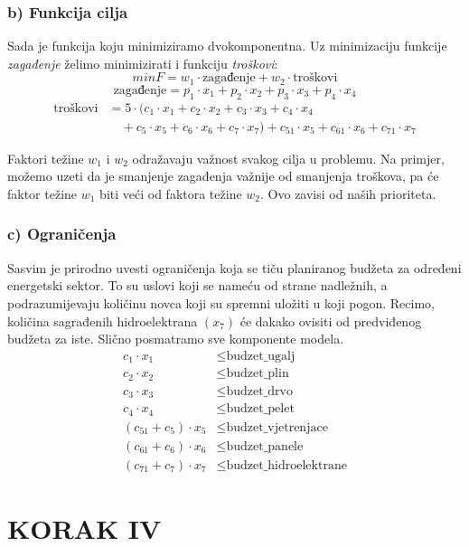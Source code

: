 \documentclass[12pt, a4paper]{paper}
\begin{document}
\subsubsection*{b) Funkcija cilja}

Sada je funkcija koju minimiziramo dvokomponentna. Uz minimizaciju funkcije \textit{zagađenje} želimo minimizirati i funkciju \textit{troškovi}:
\[min F = w_1 \cdot \text{zagađenje} + w_2 \cdot \text{troškovi}\]
\[\text{zagađenje} = p_1 \cdot x_1 + p_2 \cdot x_2 + p_3 \cdot x_3 + p_4 \cdot x_4\]
\[
\begin{split}
    \text{troškovi} & = 5 \cdot (c_1 \cdot x_1 + c_2 \cdot x_2 + c_3 \cdot x_3 + c_4 \cdot x_4 \\
    & \quad + c_5 \cdot x_5 + c_6 \cdot x_6 + c_7 \cdot x_7) + c_{51} \cdot x_5 + c_{61} \cdot x_6 + c_{71} \cdot x_7
\end{split}
\]

Faktori težine $w_1$ i $w_2$ odražavaju važnost svakog cilja u problemu. Na primjer, možemo uzeti da je smanjenje zagađenja važnije od smanjenja troškova, pa će faktor težine $w_1$ biti veći od faktora težine $w_2$. Ovo zavisi od naših prioriteta.

\subsubsection*{c) Ograničenja}

Sasvim je prirodno uvesti ograničenja koja se tiču planiranog budžeta za određeni energetski sektor. To su uslovi koji se nameću od strane nadležnih, a podrazumijevaju količinu novca koji su spremni uložiti u koji pogon. Recimo, količina sagrađenih hidroelektrana $(x_7)$ će dakako ovisiti od predviđenog budžeta za iste. Slično posmatramo sve komponente modela.
\begin{align*}
	c_1 \cdot x_1 &\leq \text{budzet\_ugalj}\\
	c_2 \cdot x_2 &\leq \text{budzet\_plin}\\
	c_3 \cdot x_3 &\leq \text{budzet\_drvo}\\
	c_4 \cdot x_4 &\leq \text{budzet\_pelet}\\
	(c_{51}+c_5) \cdot x_5 &\leq \text{budzet\_vjetrenjace}\\
	(c_{61}+c_6) \cdot x_6 &\leq \text{budzet\_panele}\\
	(c_{71}+c_7) \cdot x_7 &\leq \text{budzet\_hidroelektrane}
\end{align*}

\newpage
\section*{KORAK IV}
\end{document}
